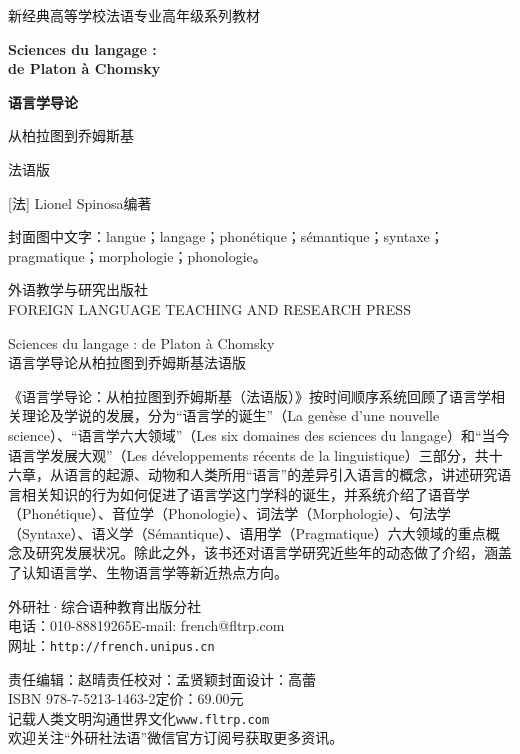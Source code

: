 \begin{center}
{\sffamily\color{BellaGray}新经典高等学校法语专业高年级系列教材}\par
\vspace{4mm}
{\Large\bfseries Sciences du langage :\\de Platon à Chomsky}\par
\vspace{4mm}
{\LARGE\bfseries 语言学导论}\par
{\Large 从柏拉图到乔姆斯基}\par
法语版\par
\vspace{3mm}
[法] Lionel Spinosa\quad 编著
\end{center}
\noindent 封面图中文字：langue；langage；phonétique；sémantique；syntaxe；pragmatique；morphologie；phonologie。
\begin{center}外语教学与研究出版社\\\small FOREIGN LANGUAGE TEACHING AND RESEARCH PRESS\end{center}
\noindent Sciences du langage : de Platon à Chomsky\\
语言学导论\quad 从柏拉图到乔姆斯基\quad 法语版

《语言学导论：从柏拉图到乔姆斯基（法语版）》按时间顺序系统回顾了语言学相关理论及学说的发展，分为“语言学的诞生”（La genèse d’une nouvelle science）、“语言学六大领域”（Les six domaines des sciences du langage）和“当今语言学发展大观”（Les développements récents de la linguistique）三部分，共十六章，从语言的起源、动物和人类所用“语言”的差异引入语言的概念，讲述研究语言相关知识的行为如何促进了语言学这门学科的诞生，并系统介绍了语音学（Phonétique）、音位学（Phonologie）、词法学（Morphologie）、句法学（Syntaxe）、语义学（Sémantique）、语用学（Pragmatique）六大领域的重点概念及研究发展状况。除此之外，该书还对语言学研究近些年的动态做了介绍，涵盖了认知语言学、生物语言学等新近热点方向。

\noindent 外研社·综合语种教育出版分社\\
电话：010-88819265\quad E-mail: french@fltrp.com\\
网址：\nolinkurl{http://french.unipus.cn}

\noindent 责任编辑：赵晴\quad 责任校对：孟贤颖\quad 封面设计：高蕾\\
ISBN 978-7-5213-1463-2\quad 定价：69.00元\\
记载人类文明\quad 沟通世界文化\quad \nolinkurl{www.fltrp.com}\\
欢迎关注“外研社法语”微信官方订阅号获取更多资讯。

